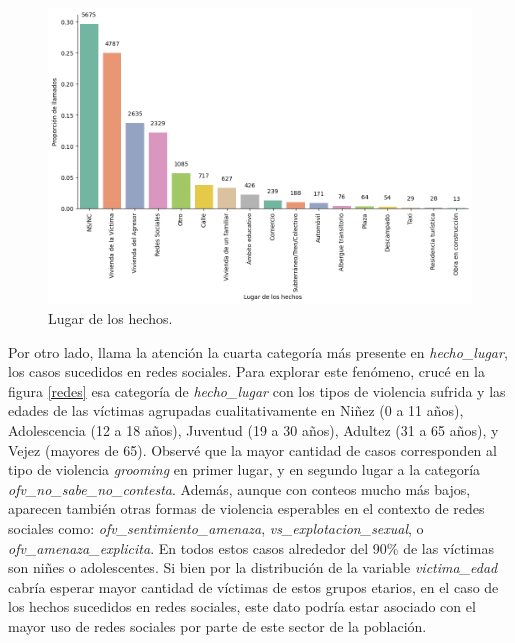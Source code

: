 \documentclass[10 pt]{article}
\begin{document}
\begin{figure}[H]
    \begin{center}
    \includegraphics[scale=.5]{images/latex_lugar_hechos.png}
    \caption{Lugar de los hechos.}
    \label{hecholugar}
    \end{center}
    \end{figure}


Por otro lado, llama la atención la cuarta categoría más presente en \textit{hecho\_lugar}, los casos sucedidos en redes sociales. Para explorar este fenómeno, crucé en la figura \ref{redes}  esa categoría de \textit{hecho\_lugar} con los tipos de violencia sufrida y las edades de las víctimas agrupadas cualitativamente en Niñez (0 a 11 años), Adolescencia (12 a 18 años), Juventud (19 a 30 años), Adultez (31 a 65 años), y Vejez (mayores de 65). Observé que la mayor cantidad de casos corresponden al tipo de violencia \textit{grooming} en primer lugar, y en segundo lugar a la categoría \textit{ofv\_no\_sabe\_no\_contesta}. Además, aunque con conteos mucho más bajos, aparecen también otras formas de violencia esperables en el contexto de redes sociales como: \textit{ofv\_sentimiento\_amenaza}, \textit{vs\_explotacion\_sexual}, o \textit{ofv\_amenaza\_explicita}. En todos estos casos alrededor del 90\% de las víctimas son niñes o adolescentes. Si bien por la distribución de la variable \textit{victima\_edad} cabría esperar mayor cantidad de víctimas de estos grupos etarios, en el caso de los hechos sucedidos en redes sociales, este dato podría estar asociado con el mayor uso de redes sociales por parte de este sector de la población. 
\end{document}

